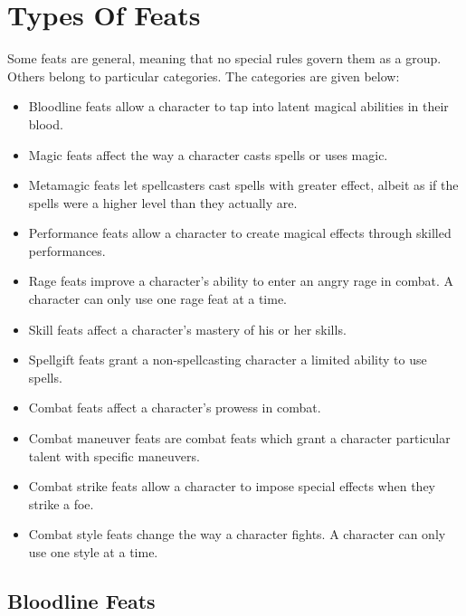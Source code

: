 \section{Types Of Feats}
Some feats are general, meaning that no special rules govern
them as a group.
Others belong to particular categories.
The categories are given below:
\begin{itemize}
    \item Bloodline feats allow a character to tap into latent magical abilities in their blood.
    \item Magic feats affect the way a character casts spells or uses magic.
    \item Metamagic feats let spellcasters cast spells with greater effect, albeit as if the spells were a higher level than they actually are.
    \item Performance feats allow a character to create magical effects through skilled performances.
    \item Rage feats improve a character's ability to enter an angry rage in combat.
        A character can only use one rage feat at a time.
    \item Skill feats affect a character's mastery of his or her skills.
    \item Spellgift feats grant a non-spellcasting character a limited ability to use spells.
    \item Combat feats affect a character's prowess in combat.
    \item Combat maneuver feats are combat feats which grant a character particular talent with specific maneuvers.
    \item Combat strike feats allow a character to impose special effects when they strike a foe.
    \item Combat style feats change the way a character fights.
        A character can only use one style at a time.
\end{itemize}

\subsection{Bloodline Feats}

